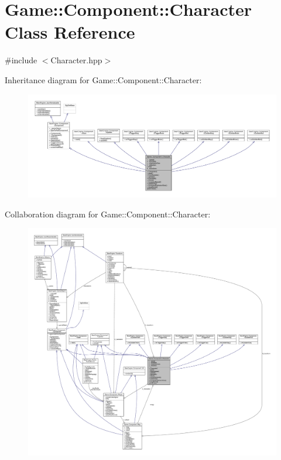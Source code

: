 \hypertarget{class_game_1_1_component_1_1_character}{}\section{Game\+:\+:Component\+:\+:Character Class Reference}
\label{class_game_1_1_component_1_1_character}


{\ttfamily \#include $<$Character.\+hpp$>$}



Inheritance diagram for Game\+:\+:Component\+:\+:Character\+:\nopagebreak
\begin{figure}[H]
\begin{center}
\leavevmode
\includegraphics[width=350pt]{class_game_1_1_component_1_1_character__inherit__graph}
\end{center}
\end{figure}


Collaboration diagram for Game\+:\+:Component\+:\+:Character\+:\nopagebreak
\begin{figure}[H]
\begin{center}
\leavevmode
\includegraphics[width=350pt]{class_game_1_1_component_1_1_character__coll__graph}
\end{center}
\end{figure}
